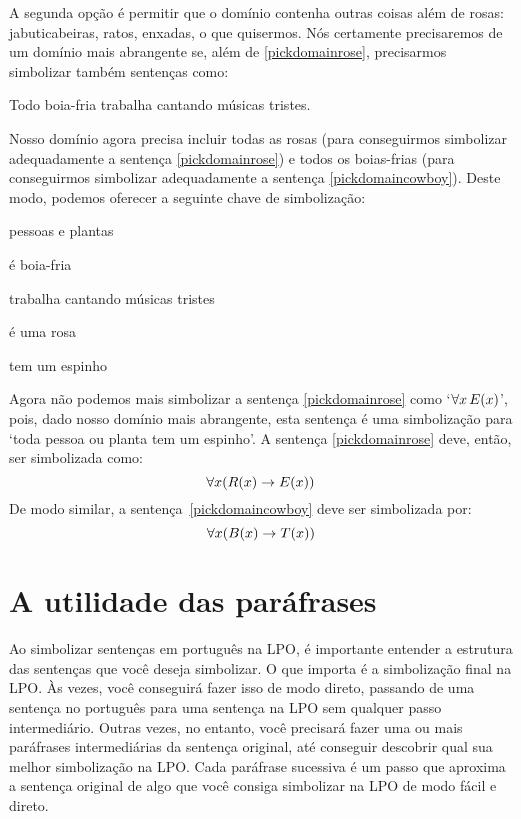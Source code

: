 A segunda opção é permitir que o domínio contenha outras coisas além de rosas: jabuticabeiras, ratos, enxadas, o que quisermos.
Nós certamente precisaremos de um domínio mais abrangente se, além de \ref{pickdomainrose}, precisarmos simbolizar também sentenças como:
	\begin{earg}
		\item[\ex{pickdomaincowboy}] Todo boia-fria trabalha cantando músicas tristes.
	\end{earg}
Nosso domínio agora precisa incluir todas as rosas (para conseguirmos simbolizar adequadamente a sentença \ref{pickdomainrose}) e todos os boias-frias (para conseguirmos simbolizar adequadamente a sentença \ref{pickdomaincowboy}). Deste modo, podemos oferecer a seguinte chave de simbolização:
	\begin{center}
	\begin{ekey}
		\item[\text{domínio}] pessoas e plantas
		\item[\atom{B}{x}]  é boia-fria
		\item[\atom{T}{x}]  trabalha cantando músicas tristes
		\item[\atom{R}{x}]  é uma rosa
		\item[\atom{E}{x}]  tem um espinho
	\end{ekey}
	\end{center}
Agora não podemos mais simbolizar a sentença \ref{pickdomainrose} como `$\forall x\, \mathord{E}(x)$', pois, dado nosso domínio mais abrangente, esta sentença é uma simbolização para `toda pessoa ou planta tem um espinho'.
A sentença \ref{pickdomainrose} deve, então, ser simbolizada como:
$$\forall x (\mathord{R}(x) \rightarrow \mathord{E}(x))$$
De modo similar, a sentença~\ref{pickdomaincowboy} deve ser simbolizada por:
$$\forall x (\mathord{B}(x) \rightarrow \mathord{T}(x))$$



\section{A utilidade das paráfrases}
Ao simbolizar sentenças em português na LPO, é importante entender a estrutura das sentenças que você deseja simbolizar.
O que importa é a simbolização final na LPO.
Às vezes, você conseguirá fazer isso de modo direto, passando de uma sentença no português para uma sentença na LPO sem qualquer passo intermediário.
Outras vezes, no entanto, você precisará fazer uma ou mais paráfrases intermediárias da sentença original, até conseguir descobrir qual sua melhor simbolização na LPO.
Cada paráfrase sucessiva é um passo que aproxima a sentença original de algo que você consiga simbolizar na LPO de modo fácil e direto.

